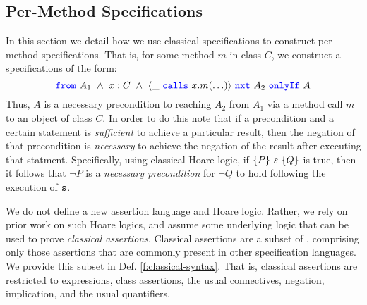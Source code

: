 

\subsection{Per-Method \Nec Specifications}
\label{s:classical-proof}
In this section we detail how we use classical specifications
to construct per-method \Nec specifications. 
That is, for some method $m$ in class $C$, we construct a specifications of the form:
$$\onlyIfSingle{A_1\ \wedge\ x : C\ \wedge\ \calls{\_}{x}{m}{\ldots}}{A_2}{A}$$
Thus, $A$ is a necessary precondition to reaching $A_2$ from $A_1$ via a method call $m$ to an object of class $C$.
In order to do this
note that if a precondition and a certain statement is \emph{sufficient}
to achieve a particular result, then the negation of that precondition
is \emph{necessary} to achieve the negation of the result after executing that statment.
Specifically, 
using classical Hoare logic, if $\{P\}\ s\ \{Q\}$ is true, then 
it follows that $\neg P$ is a \emph{necessary precondition} for $\neg Q$ to 
hold following the execution of ${\texttt{s}}$.

We do not define a new assertion language and Hoare logic.
 Rather, we rely on prior work on such Hoare logics,
  and assume some underlying logic that can be used 
to prove  \emph{classical assertions}. 
Classical assertions are a subset of \SpecO, comprising only those 
assertions that are commonly present in other specification languages.
We provide this subset in Def. \ref{f:classical-syntax}. That is, classical assertions
are restricted to expressions, class assertions, the usual connectives, negation, 
implication, and the usual quantifiers.


